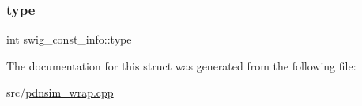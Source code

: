 \mbox{\label{structswig__const__info_ae8bbc99e1cda11f24e306365cbf33893}} 
\subsubsection{\texorpdfstring{type}{type}}
{\footnotesize\ttfamily int swig\+\_\+const\+\_\+info\+::type}



The documentation for this struct was generated from the following file\+:\begin{DoxyCompactItemize}
\item 
src/\hyperlink{pdnsim__wrap_8cpp}{pdnsim\+\_\+wrap.\+cpp}\end{DoxyCompactItemize}
